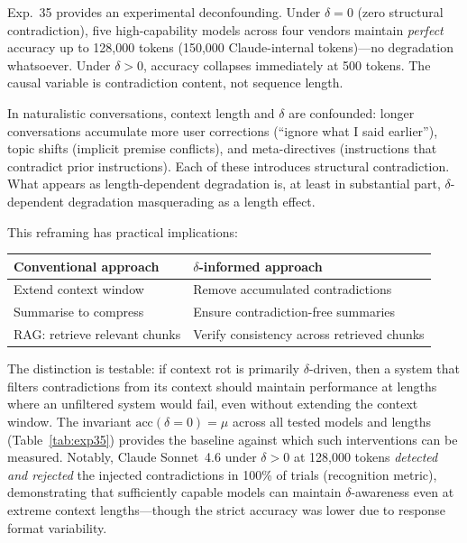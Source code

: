\documentclass[11pt,a4paper]{article}
\begin{document}
Exp.~35 provides an experimental deconfounding. Under $\delta = 0$ (zero structural contradiction), five high-capability models across four vendors maintain \emph{perfect} accuracy up to 128{,}000 tokens (150{,}000 Claude-internal tokens)---no degradation whatsoever. Under $\delta > 0$, accuracy collapses immediately at 500 tokens. The causal variable is contradiction content, not sequence length.

In naturalistic conversations, context length and $\delta$ are confounded: longer conversations accumulate more user corrections (``ignore what I said earlier''), topic shifts (implicit premise conflicts), and meta-directives (instructions that contradict prior instructions). Each of these introduces structural contradiction. What appears as length-dependent degradation is, at least in substantial part, $\delta$-dependent degradation masquerading as a length effect.

This reframing has practical implications:

\begin{center}
\small
\begin{tabular}{ll}
\toprule
\textbf{Conventional approach} & \textbf{$\delta$-informed approach} \\
\midrule
Extend context window & Remove accumulated contradictions \\
Summarise to compress & Ensure contradiction-free summaries \\
RAG: retrieve relevant chunks & Verify consistency across retrieved chunks \\
\bottomrule
\end{tabular}
\end{center}

\noindent The distinction is testable: if context rot is primarily $\delta$-driven, then a system that filters contradictions from its context should maintain performance at lengths where an unfiltered system would fail, even without extending the context window. The invariant $\text{acc}(\delta = 0) = \mu$ across all tested models and lengths (Table~\ref{tab:exp35}) provides the baseline against which such interventions can be measured. Notably, Claude Sonnet~4.6 under $\delta > 0$ at 128{,}000 tokens \emph{detected and rejected} the injected contradictions in 100\% of trials (recognition metric), demonstrating that sufficiently capable models can maintain $\delta$-awareness even at extreme context lengths---though the strict accuracy was lower due to response format variability.
\end{document}
